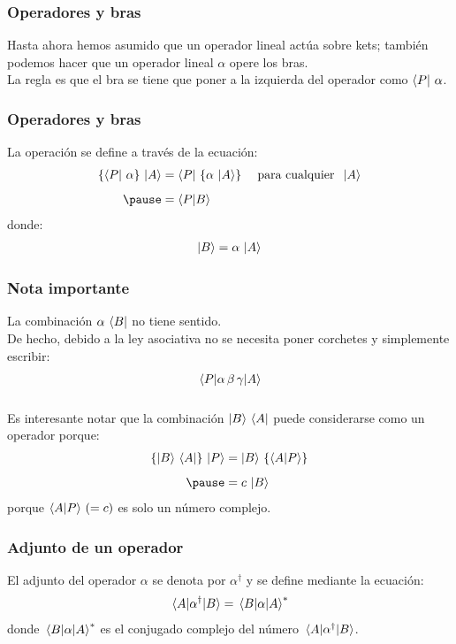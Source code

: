 \documentclass[12pt]{beamer}
\begin{document}
\begin{frame}
\frametitle{Operadores y bras}
Hasta ahora hemos asumido que un operador lineal actúa sobre kets; \pause también podemos hacer que un operador lineal $\alpha$ opere los bras.
\\
\bigskip
\pause
La regla es que el bra se tiene que poner a la izquierda del operador como $\bra{P}  \, \alpha$.
\end{frame}
\begin{frame}
\frametitle{Operadores y bras}
La operación se define a través de la ecuación:
\pause
\begin{eqnarray*}
\begin{aligned}
\left\{ \bra{P} \, \alpha \right\} \, \ket{A} &= \bra{P} \, \left\{ \alpha \, \ket{A} \right\} \hspace{0.4cm} \mbox{para cualquier} \hspace{0.2cm} \ket{A} \\[0.5em] \pause
&= \braket{P}{B}
\end{aligned}
\end{eqnarray*}
donde:
\begin{align*}
\ket{B} = \alpha \, \ket{A}
\end{align*}
\end{frame}
\begin{frame}
\frametitle{Nota importante}
La combinación $\alpha \, \bra{B}$ no tiene sentido.
\\
\bigskip
\pause
De hecho, debido a la ley asociativa no se necesita poner corchetes y simplemente escribir:
\pause
\begin{align*}
\mel{P}{\alpha \, \beta \, \gamma}{A}
\end{align*}
\end{frame}
\begin{frame}
\frametitle{}
Es interesante notar que la combinación $\ket{B} \, \bra{A}$ puede considerarse como un operador porque:
\pause
\begin{eqnarray*}
\begin{aligned}
\left\{ \ket{B} \, \bra{A} \right\} \, \ket{P} &= \ket{B} \, \left\{ \braket{A}{P} \right\} \\[0.5em] \pause
&= c \, \ket{B}
\end{aligned}
\end{eqnarray*}
\pause
porque $\braket{A}{P} \, (= c)$ es solo un número complejo.
\end{frame}
\begin{frame}
\frametitle{Adjunto de un operador}
El adjunto del operador $\alpha$ se denota por $\alpha^{\dagger}$ y se define mediante la ecuación:
\pause
\begin{align*}
\mel{A}{\alpha^{\dagger}}{B} = \mel{B}{\alpha}{A}^{*}
\end{align*}
donde $\mel{B}{\alpha}{A}^{*}$ es el conjugado complejo del número $\mel{A}{\alpha^{\dagger}}{B}$.
\end{frame}
\end{document}
